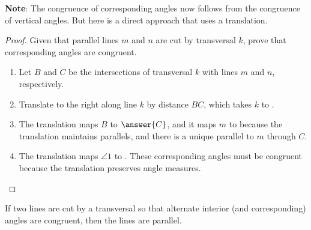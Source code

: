 \documentclass[nooutcomes]{ximera}
\begin{document}
\textbf{Note}: The congruence of corresponding angles now follows from the congruence of vertical angles.  But here is a direct approach that uses a translation.  

\begin{proof}
Given that parallel lines $m$ and $n$ are cut by transversal $k$, prove that corresponding angles are congruent.  

\begin{image}
\end{image}

\begin{enumerate}
\item Let $B$ and $C$ be the intersections of transversal $k$ with lines $m$ and $n$, respectively. 
\item Translate to the right along line $k$ by distance $BC$, which takes $k$ to .
\item The translation maps $B$ to $\answer{C}$, and it maps $m$ to  because the translation maintains parallels, and there is a unique parallel to $m$ through $C$.
\item The translation maps $\angle 1$ to .  These corresponding angles must be congruent because the translation preserves angle measures. 
\end{enumerate}

\end{proof}

\begin{theorem}
If two lines are cut by a transversal so that alternate interior (and corresponding) angles are congruent, then the lines are parallel. 
\end{theorem}
\end{document}
